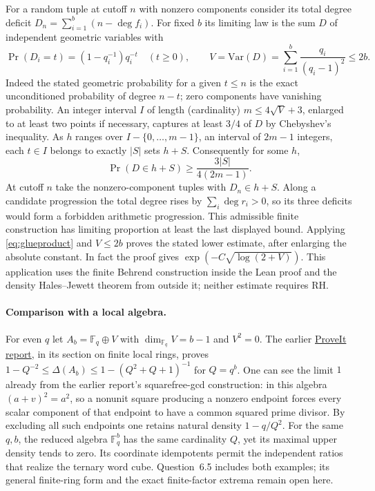 For a random tuple at cutoff $n$ with nonzero components consider its
total degree deficit $D_n=\sum_{i=1}^b(n-\deg f_i)$. For fixed $b$ its
limiting law is the sum $D$ of independent geometric variables with
\[
 \Pr(D_i=t)=(1-q_i^{-1})q_i^{-t}\quad(t\ge0),\qquad
 V=\mathrm{Var}(D)=\sum_{i=1}^b\frac{q_i}{(q_i-1)^2}\le2b .
\]
Indeed the stated geometric probability for a given $t\le n$ is the
exact unconditioned probability of degree $n-t$; zero components have
vanishing probability. An integer interval $I$ of length (cardinality)
$m\le4\sqrt V+3$, enlarged to at least two points if necessary, captures
at least $3/4$ of $D$ by Chebyshev's inequality. As $h$ ranges over
$I-\{0,\ldots,m-1\}$, an interval of $2m-1$ integers, each $t\in I$
belongs to exactly $|S|$ sets $h+S$. Consequently for some $h$,
\[
 \Pr(D\in h+S)\ge\frac{3|S|}{4(2m-1)}.
\]
At cutoff $n$ take the nonzero-component tuples with $D_n\in h+S$.
Along a candidate progression the total degree rises by $\sum_i\deg r_i>0$,
so its three deficits would form a forbidden arithmetic progression.
This admissible finite construction has limiting proportion at least the
last displayed bound. Applying \eqref{eq:glueproduct} and $V\le2b$ proves
the stated lower estimate, after enlarging the absolute constant. In fact
the proof gives $\exp(-C\sqrt{\log(2+V)})$. This application uses the
finite Behrend construction inside the Lean proof and the density
Hales--Jewett theorem from outside it; neither estimate requires RH.

\paragraph{Comparison with a local algebra.}
For even $q$ let $A_b=\mathbb F_q\oplus V$ with $\dim_{\mathbb F_q}V=b-1$
and $V^2=0$. The earlier
\href{https://github.com/VladimirReshetnikov/ProveIt/blob/5ed40f562710fcc2770bbb463dba528a6727f7ae/docs/incoming/grh_method_transfers_research.zip}{ProveIt report},
in its section on finite local rings, proves
$1-Q^{-2}\le\Delta(A_b)\le1-(Q^2+Q+1)^{-1}$ for $Q=q^b$.
One can see the limit $1$ already from the earlier report's
squarefree-gcd construction: in this algebra $(a+v)^2=a^2$, so a
nonunit square producing a nonzero endpoint forces every scalar component
of that endpoint to have a common squared prime divisor. By excluding
all such endpoints one retains natural density $1-q/Q^2$.
For the same $q,b$, the reduced algebra $\mathbb F_q^b$ has the same
cardinality $Q$, yet its maximal upper density tends to zero. Its
coordinate idempotents permit the independent ratios that realize the
ternary word cube. Question~6.5 includes both examples; its general
finite-ring form and the exact finite-factor extrema remain open here.
